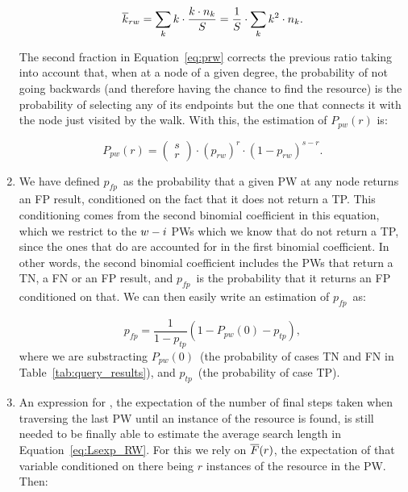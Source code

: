 \documentclass[]{elsarticle}
\newcommand{\ptp}       {\ensuremath{p_{t\!p}}}
\newcommand{\pfp}       {\ensuremath{p_{\!f\!p}}}
\newcommand{\PWx}[1]    {\ensuremath{P_{pw}(#1)}}
\begin{document}
\begin{enumerate}
\begin{equation}
 \overline{k}_{rw} = \sum_k k\cdot \frac{k\cdot n_k}{S} = \frac{1}{S} \cdot \sum_k k^2\cdot n_k.
 \label{eq:pkexp}
\end{equation}

\noindent The second fraction in Equation~\ref{eq:prw} corrects the previous ratio taking into account that, when at a node of a given degree, the probability of not going backwards (and therefore having the chance to find the resource) is the probability of selecting any of its endpoints but the one that connects it with the node just visited by the walk.
With this, the estimation of \PWx{r} is:

\begin{equation}
 \PWx{r} = \left(\begin{array}{c} s\\ r \end{array}\right) \cdot (p_{rw})^r \cdot (1-p_{rw})^{s-r}.
 \label{eq:Prw} \end{equation}


\item

We have defined \pfp\ as the probability that a given PW at any node returns an FP result, conditioned on the fact that it does not return a TP. This conditioning comes from the second binomial coefficient in this equation, which we restrict to the $w-i$ PWs which we know that do not return a TP, since the ones that do are accounted for in the first binomial coefficient. In other words, the second binomial coefficient includes the PWs that return a TN, a FN or an FP result, and \pfp\ is the probability that it returns an FP conditioned on that. We can then easily write an estimation of \pfp\ as:

\begin{equation}
 \pfp = \frac{1}{1-\ptp} \left(1-\PWx{0} - \ptp \right),
 \label{eq:pfp} \end{equation}
\noindent where we are substracting \PWx{0}\ (the probability of cases TN and FN in Table~\ref{tab:query_results}), and \ptp\ (the probability of case TP).


\item

An expression for \Texp, the expectation of the number of final steps taken when traversing the last PW until an instance of the resource is found, is still needed to be finally able to estimate the average search length in Equation~\ref{eq:Lsexp_RW}. For this we rely on $\overline{F}(r)$, the expectation of that variable conditioned on there being $r$ instances of the resource in the PW. Then:


\end{enumerate}
\end{document}

